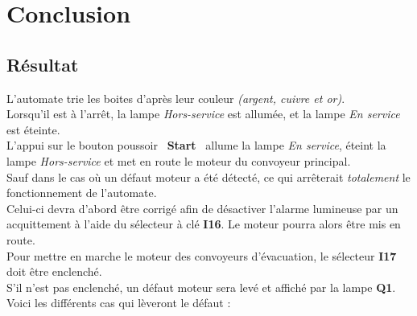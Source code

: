 \section{Conclusion}
\label{sec:conclusion}


\subsection{Résultat}
\label{sec:resultat}

L'automate trie les boites d'après leur couleur \textit{(argent, cuivre et or)}.\\

Lorsqu'il est à l'arrêt, la lampe \textit{Hors-service} est allumée, et la lampe \textit{En service} est éteinte. \\

L'appui sur le bouton poussoir  \guillemotleft \ \textbf{Start} \guillemotright \ allume la lampe \textit{En service}, éteint la lampe \textit{Hors-service} et met en route le moteur du convoyeur principal.\\
Sauf dans le cas où un défaut moteur a été détecté, ce qui arrêterait \textit{totalement} le fonctionnement de l'automate.\\
Celui-ci devra d'abord être corrigé afin de désactiver l'alarme lumineuse par un acquittement à l'aide du sélecteur à clé \textbf{I16}. Le moteur pourra alors être mis en route.\\

Pour mettre en marche le moteur des convoyeurs d'évacuation, le sélecteur \textbf{I17} doit être enclenché.\\
S'il n'est pas enclenché, un défaut moteur sera levé et affiché par la lampe \textbf{Q1}. Voici les différents cas qui lèveront le défaut :

